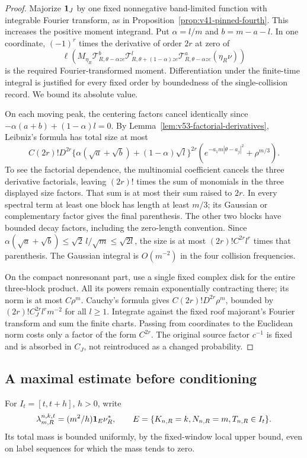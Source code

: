 \begin{proof}
Majorize $\mathbf1_J$ by one fixed nonnegative band-limited function with
integrable Fourier transform, as in
Proposition~\ref{prop:v41-pinned-fourth}. This increases the positive
moment integrand. Put $\alpha=l/m$ and $b=m-a-l$. In one coordinate,
$(-1)^r$ times the derivative of order $2r$ at zero of
\[
 \ell\left(M_{\eta_R}
 \mathscr T_{R,\theta-\alpha ze}^{b}
 \mathscr T_{R,\theta+(1-\alpha)ze}^{l}
 \mathscr T_{R,\theta-\alpha ze}^{a}(\eta_R\nu)\right)
\]
is the required Fourier-transformed moment. Differentiation under the
finite-time integral is justified for every fixed order by boundedness
of the single-collision record. We bound its absolute value.

On each moving peak, the centering factors cancel identically since
$-\alpha(a+b)+(1-\alpha)l=0$. By
Lemma~\ref{lem:v53-factorial-derivatives}, Leibniz's formula has total
size at most
\[
 C(2r)!D^{2r}
       \{\alpha(\sqrt a+\sqrt b)+(1-\alpha)\sqrt l\}^{2r}
       \left(e^{-a_1m|\theta-a_j|^2}+\rho^{m/3}\right).
\]
To see the factorial dependence, the multinomial coefficient cancels
the three derivative factorials, leaving $(2r)!$ times the sum of
monomials in the three displayed size factors. That sum is at most
their sum raised to $2r$. In every spectral term at least one block
has length at least $m/3$; its Gaussian or complementary factor gives
the final parenthesis. The other two blocks have bounded decay
factors, including the zero-length convention. Since
$\alpha(\sqrt a+\sqrt b)\le\sqrt2\,l/\sqrt m\le\sqrt{2l}$,
the size is at most $(2r)!C^{2r}l^r$ times that parenthesis.
The Gaussian integral is $O(m^{-2})$ in the four collision frequencies.

On the compact nonresonant part, use a single fixed complex disk for
the entire three-block product. All its powers remain exponentially
contracting there; its norm is at most $C\rho^m$. Cauchy's formula
gives $C(2r)!D^{2r}\rho^m$, bounded by
$(2r)!C_J^{2r}l^rm^{-2}$ for all $l\ge1$. Integrate against the
fixed roof majorant's Fourier transform and sum the finite charts.
Passing from coordinates to the Euclidean norm costs only a factor
of the form $C^{2r}$. The original source factor $c^{-1}$ is fixed
and is absorbed in $C_J$, not reintroduced as a changed probability.
\end{proof}

\subsection{A maximal estimate before conditioning}
For $I_t=[t,t+h]$, $h>0$, write
\[
 \lambda_{m,R}^{n,k,t}=(m^2/h)\mathbf1_E\nu_R^*,\qquad
 E=\{K_{n,R}=k,N_{n,R}=m,T_{n,R}\in I_t\}.
\]
Its total mass is bounded uniformly, by the fixed-window local upper
bound, even on label sequences for which the mass tends to zero.

